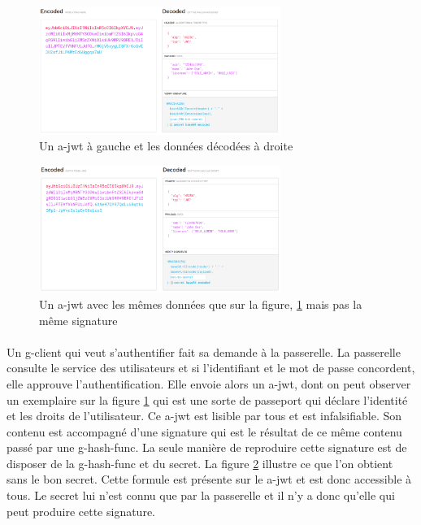 \begin{figure}[h]
    \centering
    \includegraphics[width=0.7\textwidth]{images/screenshot/jwt-good-secret.png}
    \caption{Un \gls{a-jwt} à gauche et les données décodées à droite}
    \label{fig:jwt-good}
\end{figure}
\begin{figure}[h]
    \centering
    \includegraphics[width=0.7\textwidth]{images/screenshot/jwt-bad-secret.png}
    \caption{Un \gls{a-jwt} avec les mêmes données que sur la figure, \ref{fig:jwt-good} mais pas la même signature}
    \label{fig:jwt-bad}
\end{figure}

\paragraph{}
Un \gls{g-client} qui veut s'authentifier fait sa demande à la passerelle.
La passerelle consulte le service des utilisateurs et si l'identifiant et le mot de passe concordent, elle approuve l'authentification.
Elle envoie alors un \gls{a-jwt}, dont on peut observer un exemplaire sur la figure \ref{fig:jwt-good} qui est une sorte de passeport qui déclare l'identité et les droits de l'utilisateur.
Ce \gls{a-jwt} est lisible par tous et est infalsifiable. Son contenu est accompagné d'une signature qui est le résultat de ce même contenu passé par une \gls{g-hash-func}.
La seule manière de reproduire cette signature est de disposer de la \gls{g-hash-func} et du secret.
La figure \ref{fig:jwt-bad} illustre ce que l'on obtient sans le bon secret.
Cette formule est présente sur le \gls{a-jwt} et est donc accessible à tous.
Le secret lui n'est connu que par la passerelle et il n'y a donc qu'elle qui peut produire cette signature.

